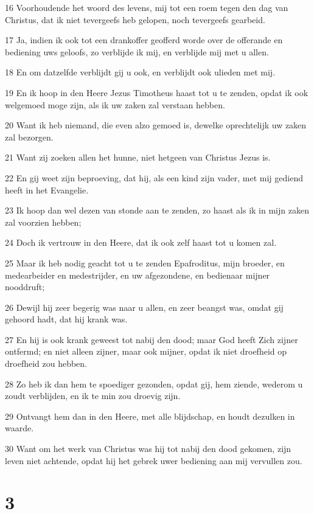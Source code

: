 \par 16 Voorhoudende het woord des levens, mij tot een roem tegen den dag van Christus, dat ik niet tevergeefs heb gelopen, noch tevergeefs gearbeid.
\par 17 Ja, indien ik ook tot een drankoffer geofferd worde over de offerande en bediening uws geloofs, zo verblijde ik mij, en verblijde mij met u allen.
\par 18 En om datzelfde verblijdt gij u ook, en verblijdt ook ulieden met mij.
\par 19 En ik hoop in den Heere Jezus Timotheus haast tot u te zenden, opdat ik ook welgemoed moge zijn, als ik uw zaken zal verstaan hebben.
\par 20 Want ik heb niemand, die even alzo gemoed is, dewelke oprechtelijk uw zaken zal bezorgen.
\par 21 Want zij zoeken allen het hunne, niet hetgeen van Christus Jezus is.
\par 22 En gij weet zijn beproeving, dat hij, als een kind zijn vader, met mij gediend heeft in het Evangelie.
\par 23 Ik hoop dan wel dezen van stonde aan te zenden, zo haast als ik in mijn zaken zal voorzien hebben;
\par 24 Doch ik vertrouw in den Heere, dat ik ook zelf haast tot u komen zal.
\par 25 Maar ik heb nodig geacht tot u te zenden Epafroditus, mijn broeder, en medearbeider en medestrijder, en uw afgezondene, en bedienaar mijner nooddruft;
\par 26 Dewijl hij zeer begerig was naar u allen, en zeer beangst was, omdat gij gehoord hadt, dat hij krank was.
\par 27 En hij is ook krank geweest tot nabij den dood; maar God heeft Zich zijner ontfermd; en niet alleen zijner, maar ook mijner, opdat ik niet droefheid op droefheid zou hebben.
\par 28 Zo heb ik dan hem te spoediger gezonden, opdat gij, hem ziende, wederom u zoudt verblijden, en ik te min zou droevig zijn.
\par 29 Ontvangt hem dan in den Heere, met alle blijdschap, en houdt dezulken in waarde.
\par 30 Want om het werk van Christus was hij tot nabij den dood gekomen, zijn leven niet achtende, opdat hij het gebrek uwer bediening aan mij vervullen zou.

\chapter{3}

